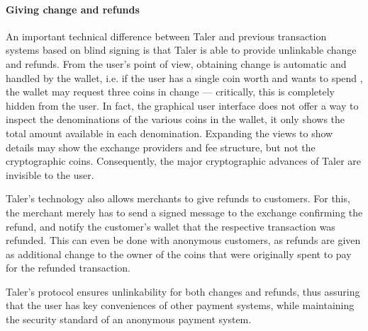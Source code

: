 \documentclass{IEEEtran}
\begin{document}

\paragraph{Giving change and refunds} %

An important technical difference between Taler and previous
transaction systems based on blind signing is that Taler is able to
provide unlinkable change and refunds.  From the user's point of view,
obtaining change is automatic and handled by the wallet, i.e. if the
user has a single coin worth  and wants to spend , the
wallet may request three  coins in change --- critically, this
is completely hidden from the user. In fact, the graphical user
interface does not offer a way to inspect the denominations of the
various coins in the wallet, it only shows the total amount available
in each denomination.  Expanding the views to show details may show
the exchange providers and fee structure, but not the cryptographic
coins.  Consequently, the major cryptographic advances of Taler are
invisible to the user.

Taler's technology also allows merchants to give refunds to
customers. For this, the merchant merely has to send a signed
message to the exchange confirming the refund, and notify the
customer's wallet that the respective transaction was refunded.
This can even be done with anonymous customers, as refunds are
given as additional change to the owner of the coins that were
originally spent to pay for the refunded transaction.

Taler's protocol ensures unlinkability for both changes and refunds,
thus assuring that the user has key conveniences of other payment
systems, while maintaining the security standard of an anonymous
payment system.
\end{document}
